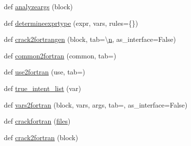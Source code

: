 \begin{DoxyCompactItemize}
\item 
def \hyperlink{namespacenumpy_1_1f2py_1_1crackfortran_a1261de05012febb3f40d509a98bf8970}{analyzeargs} (block)
\item 
def \hyperlink{namespacenumpy_1_1f2py_1_1crackfortran_a0d212929c2f31ccba1a89ecc5b79395e}{determineexprtype} (expr, vars, rules=\{\})
\item 
def \hyperlink{namespacenumpy_1_1f2py_1_1crackfortran_aa415a4cafdd8467c5aba7c8b897fb4dd}{crack2fortrangen} (block, tab=\textquotesingle{}\textbackslash{}\hyperlink{namespacenumpy_a352663c52853d2754274407d5cae2832}{n}\textquotesingle{}, as\+\_\+interface=False)
\item 
def \hyperlink{namespacenumpy_1_1f2py_1_1crackfortran_a22e8dd83d4df533c9adee7b5641eeb7a}{common2fortran} (common, tab=\textquotesingle{}\textquotesingle{})
\item 
def \hyperlink{namespacenumpy_1_1f2py_1_1crackfortran_a98a2eae39bf5b19c89adadf5eb0f7d22}{use2fortran} (use, tab=\textquotesingle{}\textquotesingle{})
\item 
def \hyperlink{namespacenumpy_1_1f2py_1_1crackfortran_a59b885337d36caf83be4b2690ff716f5}{true\+\_\+intent\+\_\+list} (var)
\item 
def \hyperlink{namespacenumpy_1_1f2py_1_1crackfortran_a663a64557977a7f6fd78a2fcf7db94a9}{vars2fortran} (block, vars, args, tab=\textquotesingle{}\textquotesingle{}, as\+\_\+interface=False)
\item 
def \hyperlink{namespacenumpy_1_1f2py_1_1crackfortran_a1800211dab5f4fa482aaf80486889288}{crackfortran} (\hyperlink{namespacenumpy_1_1f2py_1_1crackfortran_a6b51cb9db078a82c72e90170313932c1}{files})
\item 
def \hyperlink{namespacenumpy_1_1f2py_1_1crackfortran_a853452b3ad4c97af9062b36ee8c71f21}{crack2fortran} (block)
\end{DoxyCompactItemize}
